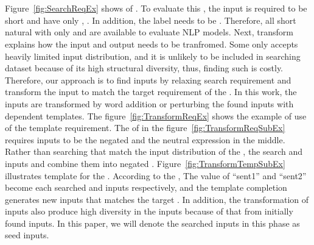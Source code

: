 \begin{figure}[t]
  \centering
  
  \vspace{-10pt}
  \caption{\SearchRequirementExampleFigCaption}
  \vspace{-10pt}
\end{figure}

\begin{figure}[t]
  \centering
  \subfloat[][\TransformRequirementExampleSubFigCaption]{}
  \\
  \subfloat[][\TransformTemplateExampleSubFigCaption]{}
  \\
  \caption{\TransformRequirementExampleFigCaption}
  \vspace{-10pt}
\end{figure}

Figure~\ref{fig:SearchReqEx} shows \lc of \SareqExOne. To evaluate
this \lc, the input is required to be short and have only \neu \adjs,
\neu \nns. In addition, the label needs to be \neu. Therefore, all
short natural \sents with only \neu \adjs and \neu \nns are available
to evaluate NLP models. Next, transform \req explains how the input
and output needs to be tranfromed. Some \lc only accepts heavily
limited input distribution, and it is unlikely to be included in
searching dataset because of its high structural diversity, thus,
finding such \sents is costly. Therefore, our approach is to find
inputs by relaxing search requirement and transform the input to match
the target requirement of the \lc. In this work, the inputs are
transformed by word addition or perturbing the found inputs with \lc
dependent templates. The figure~\ref{fig:TransformReqEx} shows the
example of use of the template requirement. The \lc of \SareqExTwo in
the figure~\ref{fig:TransformReqSubEx} requires inputs to be the
negated \pstv \sents and the neutral expression in the middle. Rather
than searching \sents that match the input distribution of the \lc,
the \Model search \pstv and \neu inputs and combine them into negated
\pstv \sents. Figure~\ref{fig:TransformTempSubEx} illustrates template
for the \lc. According to the \lc, The value of ``sent1'' and
``sent2'' become each searched \neu and \pstv inputs respectively, and
the template completion generates new inputs that matches the target
\lc. In addition, the transformation of inputs also produce high
diversity in the inputs because of that from initially found
inputs. In this paper, we will denote the searched inputs in this
phase as seed inputs.

